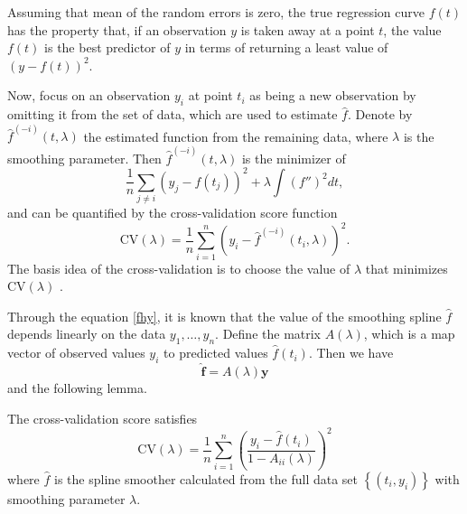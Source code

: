 Assuming that mean of the random errors is zero, the true regression curve $f(t)$ has the property that, if an observation $y$ is taken away at a point $t$, the value $f(t)$ is the best predictor of $y$ in terms of returning a least value of $\left(y-f(t)\right)^2$. 

Now, focus on an observation $y_i$ at point $t_i$ as being a new observation by omitting it from the set of data, which are used to estimate $\hat{f}$. Denote by $\hat{f}^{(-i)}(t,\lambda)$ the estimated function from the remaining data, where $\lambda$ is the smoothing parameter. Then $\hat{f}^{(-i)}\left(t,\lambda\right)$ is the minimizer of  
\begin{equation}\label{originalcv}
\frac{1}{n}\sum_{j \neq i}\left(y_j-f(t_j) \right)^2+\lambda\int (f'')^2dt,
\end{equation}
and can be quantified by the cross-validation score function
\begin{equation*}
\mbox{CV}(\lambda)=\frac{1}{n}\sum_{i=1}^{n}\left(  y_i-\hat{f}^{(-i)}(t_i,\lambda)\right) ^2.
\end{equation*}
The basis idea of the cross-validation is to choose the value of $\lambda$ that minimizes $\mbox{CV}(\lambda)$ \citep{green1993nonparametric}. 

Through the equation \eqref{fhy}, it is known that the value of the smoothing spline $\hat{f}$ depends linearly on the data $y_1,\ldots,y_n$. Define the matrix $A(\lambda)$, which is a map vector of observed values $y_i$ to predicted values $\hat{f}(t_i)$. Then we have
\begin{equation*}\label{crossvalidationmatrixA}
\hat{\mathbf{f}}=A(\lambda)\mathbf{y}
\end{equation*}
and the following lemma.
\begin{lemma}\citep{green1993nonparametric}\label{cvlema}
The cross-validation score satisfies
\begin{equation*}
\mbox{CV}(\lambda)=\frac{1}{n} \sum_{i=1}^n \left(\frac{y_i-\hat{f}(t_i)}{1-A_{ii}(\lambda)}\right)^2
\end{equation*}
where $\hat{f}$ is the spline smoother calculated from the full data set $\left\lbrace (t_i,y_i)\right\rbrace$ with smoothing parameter $\lambda$.
\end{lemma}

